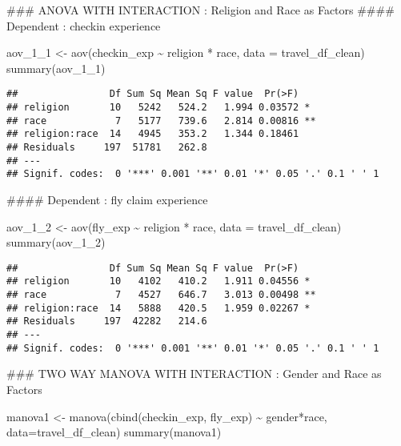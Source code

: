 \documentclass[
]{article}
\newenvironment{Shaded}{\begin{snugshade}}{\end{snugshade}}
\newcommand{\AttributeTok}[1]{\textcolor[rgb]{0.77,0.63,0.00}{#1}}
\newcommand{\FunctionTok}[1]{\textcolor[rgb]{0.00,0.00,0.00}{#1}}
\newcommand{\NormalTok}[1]{#1}
\newcommand{\OtherTok}[1]{\textcolor[rgb]{0.56,0.35,0.01}{#1}}
\newcommand{\SpecialCharTok}[1]{\textcolor[rgb]{0.00,0.00,0.00}{#1}}
\begin{document}
\hfill\break
\#\#\# ANOVA WITH INTERACTION : Religion and Race as Factors \#\#\#\#
Dependent : checkin experience

\begin{Shaded}
\begin{Highlighting}[]
\NormalTok{aov\_1\_1 }\OtherTok{\textless{}{-}} \FunctionTok{aov}\NormalTok{(checkin\_exp }\SpecialCharTok{\textasciitilde{}}\NormalTok{ religion }\SpecialCharTok{*}\NormalTok{ race, }\AttributeTok{data =}\NormalTok{ travel\_df\_clean)}
\FunctionTok{summary}\NormalTok{(aov\_1\_1)}
\end{Highlighting}
\end{Shaded}

\begin{verbatim}
##                Df Sum Sq Mean Sq F value  Pr(>F)   
## religion       10   5242   524.2   1.994 0.03572 * 
## race            7   5177   739.6   2.814 0.00816 **
## religion:race  14   4945   353.2   1.344 0.18461   
## Residuals     197  51781   262.8                   
## ---
## Signif. codes:  0 '***' 0.001 '**' 0.01 '*' 0.05 '.' 0.1 ' ' 1
\end{verbatim}

\hfill\break
\#\#\#\# Dependent : fly claim experience

\begin{Shaded}
\begin{Highlighting}[]
\NormalTok{aov\_1\_2 }\OtherTok{\textless{}{-}} \FunctionTok{aov}\NormalTok{(fly\_exp }\SpecialCharTok{\textasciitilde{}}\NormalTok{ religion }\SpecialCharTok{*}\NormalTok{ race, }\AttributeTok{data =}\NormalTok{ travel\_df\_clean)}
\FunctionTok{summary}\NormalTok{(aov\_1\_2)}
\end{Highlighting}
\end{Shaded}

\begin{verbatim}
##                Df Sum Sq Mean Sq F value  Pr(>F)   
## religion       10   4102   410.2   1.911 0.04556 * 
## race            7   4527   646.7   3.013 0.00498 **
## religion:race  14   5888   420.5   1.959 0.02267 * 
## Residuals     197  42282   214.6                   
## ---
## Signif. codes:  0 '***' 0.001 '**' 0.01 '*' 0.05 '.' 0.1 ' ' 1
\end{verbatim}

\hfill\break
\#\#\# TWO WAY MANOVA WITH INTERACTION : Gender and Race as Factors

\begin{Shaded}
\begin{Highlighting}[]
\NormalTok{manova1 }\OtherTok{\textless{}{-}} \FunctionTok{manova}\NormalTok{(}\FunctionTok{cbind}\NormalTok{(checkin\_exp, fly\_exp) }\SpecialCharTok{\textasciitilde{}}\NormalTok{ gender}\SpecialCharTok{*}\NormalTok{race, }\AttributeTok{data=}\NormalTok{travel\_df\_clean)}
\FunctionTok{summary}\NormalTok{(manova1)}
\end{Highlighting}
\end{Shaded}
\end{document}
